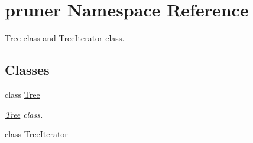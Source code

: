 \hypertarget{namespacepruner}{}\section{pruner Namespace Reference}
\label{namespacepruner}


\hyperlink{classpruner_1_1Tree}{Tree} class and \hyperlink{classpruner_1_1TreeIterator}{Tree\+Iterator} class.  


\subsection*{Classes}
\begin{DoxyCompactItemize}
\item 
class \hyperlink{classpruner_1_1Tree}{Tree}
\begin{DoxyCompactList}\small\item\em \hyperlink{classpruner_1_1Tree}{Tree} class. \end{DoxyCompactList}\item 
class \hyperlink{classpruner_1_1TreeIterator}{Tree\+Iterator}
\end{DoxyCompactItemize}
